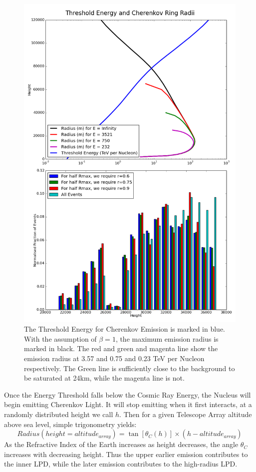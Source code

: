 \documentclass{article}
\begin{document}
\begin{figure}
\begin{center}
\includegraphics[height=0.9\textheight]{logenergyradius}
\caption{The Threshold Energy for Cherenkov Emission is marked in blue. With the assumption of $\beta=1$, the maximum emission radius is marked in black. The red and green and magenta line show the emission radius at 3.57 and 0.75 and 0.23 TeV per Nucleon respectively. The Green line is sufficiently close to the background to be saturated at 24km, while the magenta line is not.}
\label{fig:generalenergy}
\end{center}
\end{figure}

Once the Energy Threshold falls below the Cosmic Ray Energy, the Nucleus will begin emitting Cherenkov Light. It will stop emitting when it first interacts, at a randomly distributed height we call $h$. Then for a given Telescope Array altitude above sea level, simple trigonometry yields:
\[ Radius(height = altitude_{array}) = \tan [\theta_{C}(h)] \times (h - altitude_{array})\]
As the Refractive Index of the Earth increases as height decreases, the angle $\theta_{C}$ increases with decreasing height. Thus the upper earlier emission contributes to the inner LPD, while the later emission contributes to the high-radius LPD. 
\end{document}
